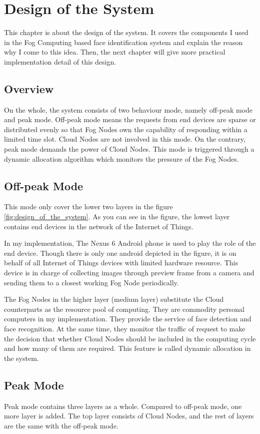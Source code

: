 \chapter{Design of the System} \label{chap:design}
This chapter is about the design of the system. It covers the components I used in the Fog Computing based face identification system and explain the reason why I come to this idea. Then, the next chapter will give more practical implementation detail of this design.

\section{Overview}
On the whole, the system consists of two behaviour mode, namely off-peak mode and peak mode. Off-peak mode means the requests from end devices are sparse or distributed evenly so that Fog Nodes own the capability of responding within a limited time slot. Cloud Nodes are not involved in this mode. On the contrary, peak mode demands the power of Cloud Nodes. This mode is triggered through a dynamic allocation algorithm which monitors the pressure of the Fog Nodes.

\section{Off-peak Mode}
This mode only cover the lower two layers in the figure \ref{fig:design_of_the_system}. As you can see in the figure, the lowest layer contains end devices in the network of the Internet of Things. 

In my implementation, The Nexus 6 Android phone is used to play the role of the end device. Though there is only one android depicted in the figure, it is on behalf of all Internet of Things devices with limited hardware resource. This device is in charge of collecting images through preview frame from a camera and sending them to a closest working Fog Node periodically.

The Fog Nodes in the higher layer (medium layer) substitute the Cloud counterparts as the resource pool of computing. They are commodity personal computers in my implementation. They provide the service of face detection and face recognition. At the same time, they monitor the traffic of request to make the decision that whether Cloud Nodes should be included in the computing cycle and how many of them are required. This feature is called dynamic allocation in the system.

\section{Peak Mode}
Peak mode contains three layers as a whole. Compared to off-peak mode, one more layer is added. The top layer consists of Cloud Nodes, and the rest of layers are the same with the off-peak mode.

